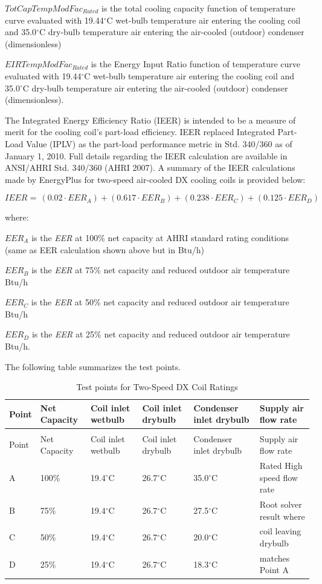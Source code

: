 \(TotCapTempModFac_{Rated}\) is the total cooling capacity function of temperature curve evaluated with 19.44\(^{\circ}\)C wet-bulb temperature air entering the cooling coil and 35.0\(^{\circ}\)C dry-bulb temperature air entering the air-cooled (outdoor) condenser (dimensionless)

\(EIRTempModFa{c_{Rated}}\) is the Energy Input Ratio function of temperature curve evaluated with 19.44\(^{\circ}\)C wet-bulb temperature air entering the cooling coil and 35.0\(^{\circ}\)C dry-bulb temperature air entering the air-cooled (outdoor) condenser (dimensionless).

The Integrated Energy Efficiency Ratio (IEER) is intended to be a measure of merit for the cooling coil's part-load efficiency. IEER replaced Integrated Part-Load Value (IPLV) as the part-load performance metric in Std. 340/360 as of January 1, 2010. Full details regarding the IEER calculation are available in ANSI/AHRI Std. 340/360 (AHRI 2007). A summary of the IEER calculations made by EnergyPlus for two-speed air-cooled DX cooling coils is provided below:

\begin{equation}
  IEER = \,(0.02 \cdot EE{R_A}) + (0.617 \cdot EE{R_B}) + (0.238 \cdot EE{R_C}) + (0.125 \cdot EE{R_D})
\end{equation}

where:

\(EER_A\) is the \emph{EER} at 100\% net capacity at AHRI standard rating conditions (same as EER calculation shown above but in Btu/h)

\(EER_B\) is the \emph{EER} at 75\% net capacity and reduced outdoor air temperature Btu/h

\(EER_C\) is the \emph{EER} at 50\% net capacity and reduced outdoor air temperature Btu/h

\(EER_D\) is the \emph{EER} at 25\% net capacity and reduced outdoor air temperature Btu/h.

The following table summarizes the test points.

\begin{longtable}[c]{p{0.8in}p{0.8in}p{0.8in}p{0.8in}p{0.8in}p{2.0in}}
\caption{Test points for Two-Speed DX Coil Ratings \label{table:test-points-for-two-speed-dx-coil-ratings}} \tabularnewline
\toprule 
Point & Net Capacity & Coil inlet wetbulb & Coil inlet drybulb & Condenser inlet drybulb & Supply air flow rate \tabularnewline
\midrule
\endfirsthead

\caption[]{Test points for Two-Speed DX Coil Ratings} \tabularnewline
\toprule 
Point & Net Capacity & Coil inlet wetbulb & Coil inlet drybulb & Condenser inlet drybulb & Supply air flow rate \tabularnewline
\midrule
\endhead

A & 100\% & 19.4\(^{\circ}\)C & 26.7\(^{\circ}\)C & 35.0\(^{\circ}\)C & Rated High speed flow rate \tabularnewline
\midrule
B & 75\% & 19.4\(^{\circ}\)C & 26.7\(^{\circ}\)C & 27.5\(^{\circ}\)C & Root solver result where \tabularnewline
C & 50\% & 19.4\(^{\circ}\)C & 26.7\(^{\circ}\)C & 20.0\(^{\circ}\)C & coil leaving drybulb\tabularnewline
D & 25\% & 19.4\(^{\circ}\)C & 26.7\(^{\circ}\)C & 18.3\(^{\circ}\)C & matches Point A\tabularnewline
\bottomrule
\end{longtable}

